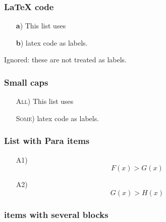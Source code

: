 \documentclass[
]{article}
\providecommand{\tightlist}{%
  \setlength{\itemsep}{0pt}\setlength{\parskip}{0pt}}
\begin{document}
\hypertarget{latex-code}{%
\subsubsection{LaTeX code}\label{latex-code}}

\begin{itemize}
\tightlist

\item[\textbf{a})] This list uses

\item[\textbf{b})] latex code as labels.

\end{itemize}

Ignored: these are not treated as labels.

\hypertarget{small-caps}{%
\subsubsection{Small caps}\label{small-caps}}

\begin{itemize}
\tightlist

\item[\textsc{All})] This list uses

\item[\textsc{Some})] latex code as labels.

\end{itemize}

\hypertarget{list-with-para-items}{%
\subsubsection{List with Para items}\label{list-with-para-items}}

\begin{itemize}
\tightlist

\item[A1)] \[F(x) > G(x)\]

\item[A2)] \[G(x) > H(x)\]

\end{itemize}

\hypertarget{items-with-several-blocks}{%
\subsubsection{items with several
blocks}\label{items-with-several-blocks}}
\end{document}
